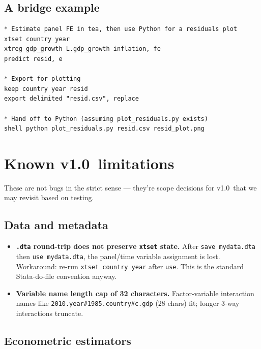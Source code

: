 \documentclass[11pt,letterpaper]{article}
\newcommand{\teaversion}{1.0}
\begin{document}
\subsection{A bridge example}

\begin{lstlisting}
* Estimate panel FE in tea, then use Python for a residuals plot
xtset country year
xtreg gdp_growth L.gdp_growth inflation, fe
predict resid, e

* Export for plotting
keep country year resid
export delimited "resid.csv", replace

* Hand off to Python (assuming plot_residuals.py exists)
shell python plot_residuals.py resid.csv resid_plot.png
\end{lstlisting}

\section{Known v\teaversion\ limitations}

These are not bugs in the strict sense — they're scope decisions for
v\teaversion\ that we may revisit based on testing.

\subsection{Data and metadata}

\begin{itemize}[leftmargin=*]
\item \textbf{\texttt{.dta} round-trip does not preserve \texttt{xtset}
state.}  After \texttt{save mydata.dta} then \texttt{use mydata.dta},
the panel/time variable assignment is lost.  Workaround: re-run
\texttt{xtset country year} after \texttt{use}.  This is the standard
Stata-do-file convention anyway.
\item \textbf{Variable name length cap of 32 characters.}  Factor-variable
interaction names like \texttt{2010.year\#1985.country\#c.gdp} (28
chars) fit; longer 3-way interactions truncate.
\end{itemize}

\subsection{Econometric estimators}
\end{document}
